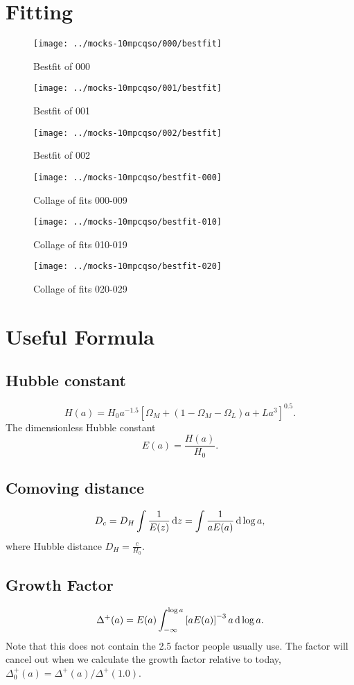 \documentclass{paper}
\begin{document}
\section{Fitting}
\begin{figure}
    \texttt{[image: ../mocks-10mpcqso/000/bestfit]}
    \caption{Bestfit of 000}
\end{figure}
\begin{figure}
    \texttt{[image: ../mocks-10mpcqso/001/bestfit]}
    \caption{Bestfit of 001}
\end{figure}
\begin{figure}
    \texttt{[image: ../mocks-10mpcqso/002/bestfit]}
    \caption{Bestfit of 002}
\end{figure}
\begin{figure}
    \texttt{[image: ../mocks-10mpcqso/bestfit-000]}
    \caption{Collage of fits 000-009}
\end{figure}
\begin{figure}
    \texttt{[image: ../mocks-10mpcqso/bestfit-010]}
    \caption{Collage of fits 010-019}
\end{figure}
\begin{figure}
    \texttt{[image: ../mocks-10mpcqso/bestfit-020]}
    \caption{Collage of fits 020-029}
\end{figure}

\section{Useful Formula}
\subsection{Hubble constant}
\[
    H(a) = H_0 a^{-1.5} \left[\Omega_M + 
           (1 - \Omega_M - \Omega_L) a +
       L a^3 \right] ^ {0.5}  .
\] 
The dimensionless Hubble constant
\[
    E(a) = \frac{H(a)}{H_0} .
\]

\subsection{Comoving distance}
\[
    D_c = D_H \int \frac{1}{E(z)} \,\mathrm{d} z 
        = \int \frac{1}{a E(a)} \,\mathrm{d} \log a,
\]
where Hubble distance $D_H = \frac{c}{H_0}$.
\subsection{Growth Factor}
\[
    \Delta^+(a) = E(a) 
\int_{-\infty}^{\log a} \left[a E(a)\right]^{-3} a \,\mathrm{d} \log a .
\]
Note that this does not contain the 2.5 factor people
usually use. The factor will cancel out when we calculate
the growth factor relative to today,
$\Delta^+_0(a) = \Delta^+(a) / \Delta^+(1.0)$.
\end{document}
